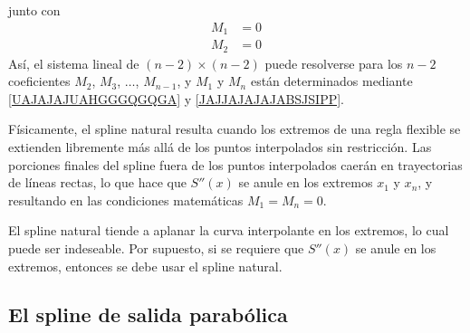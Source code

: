 junto con
\begin{align}
    M_1 & = 0 \label{UAJAJAJUAHGGGQGQGA} \\
    M_2 & = 0 \label{JAJJAJAJAJABSJSIPP}
\end{align}
Así, el sistema lineal de $(n - 2) \times (n - 2)$ puede resolverse para los $n - 2$ coeficientes $M_2$, $M_3$, $\dots$, $M_{n-1}$, y $M_1$ y $M_n$ están determinados mediante \eqref{UAJAJAJUAHGGGQGQGA} y \eqref{JAJJAJAJAJABSJSIPP}.

Físicamente, el spline natural resulta cuando los extremos de una regla flexible se extienden libremente más allá de los puntos interpolados sin restricción. Las porciones finales del spline fuera de los puntos interpolados caerán en trayectorias de líneas rectas, lo que hace que $S''(x)$ se anule en los extremos $x_1$ y $x_n$, y resultando en las condiciones matemáticas $M_1 = M_n = 0$.

El spline natural tiende a aplanar la curva interpolante en los extremos, lo cual puede ser indeseable. Por supuesto, si se requiere que $S''(x)$ se anule en los extremos, entonces se debe usar el spline natural.

\subsection*{El spline de salida parabólica}

